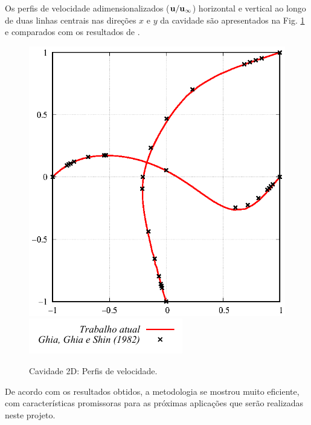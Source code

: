 \documentclass[tese_patricia]{subfiles}
\begin{document}
Os perfis de velocidade adimensionalizados ($\mathbf{u}/\mathbf{u}_{\infty}$) horizontal e vertical ao longo de duas linhas centrais nas direções $x$ e $y$ da cavidade são apresentados na Fig. \ref{fig:cavidade_graficos_overlap} e comparados com os resultados de .

\begin{figure}[!htb]
	\centering
	{\includegraphics[scale=0.8,trim=0cm 0cm 0cm 0cm, clip=true]{Imagens/Cap4/cavidade_Re100.eps}}\\
	{\includegraphics[scale=1.0,trim=0cm 0cm 0cm 0cm, clip=true]{Imagens/Cap4/legenda.pdf}}
	\caption{Cavidade 2D: Perfis de velocidade.} 
	\label{fig:cavidade_graficos_overlap}
\end{figure}

De acordo com os resultados obtidos, a metodologia se mostrou muito eficiente, com características promissoras para as próximas aplicações que serão realizadas neste projeto.
%
%
\end{document}
